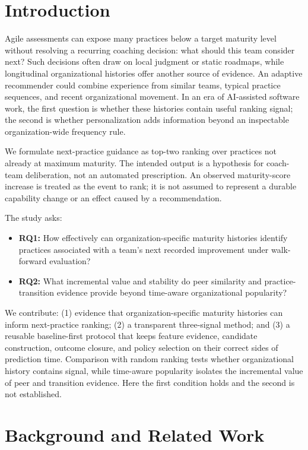 \documentclass[runningheads]{llncs}
\begin{document}
\section{Introduction}

Agile assessments can expose many practices below a target maturity level without resolving a recurring coaching decision: what should this team consider next? Such decisions often draw on local judgment or static roadmaps, while longitudinal organizational histories offer another source of evidence. An adaptive recommender could combine experience from similar teams, typical practice sequences, and recent organizational movement. In an era of AI-assisted software work, the first question is whether these histories contain useful ranking signal; the second is whether personalization adds information beyond an inspectable organization-wide frequency rule.

We formulate next-practice guidance as top-two ranking over practices not already at maximum maturity. The intended output is a hypothesis for coach-team deliberation, not an automated prescription. An observed maturity-score increase is treated as the event to rank; it is not assumed to represent a durable capability change or an effect caused by a recommendation.

The study asks:
\begin{itemize}
\item \textbf{RQ1:} How effectively can organization-specific maturity histories identify practices associated with a team's next recorded improvement under walk-forward evaluation?
\item \textbf{RQ2:} What incremental value and stability do peer similarity and practice-transition evidence provide beyond time-aware organizational popularity?
\end{itemize}

We contribute: (1) evidence that organization-specific maturity histories can inform next-practice ranking; (2) a transparent three-signal method; and (3) a reusable baseline-first protocol that keeps feature evidence, candidate construction, outcome closure, and policy selection on their correct sides of prediction time. Comparison with random ranking tests whether organizational history contains signal, while time-aware popularity isolates the incremental value of peer and transition evidence. Here the first condition holds and the second is not established.

\section{Background and Related Work}
\end{document}
